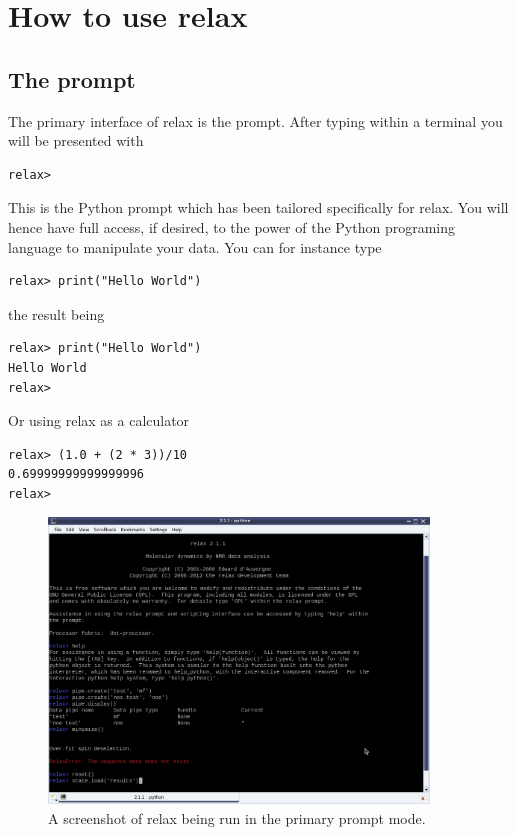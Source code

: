 
\section{How to use relax}



\subsection{The prompt}

The primary interface of relax is the prompt.  After typing  within a terminal you will be presented with

\begin{lstlisting}[numbers=none]
relax>
\end{lstlisting}

This is the Python prompt which has been tailored specifically for relax.  You will hence have full access, if desired, to the power of the Python programing language to manipulate your data.  You can for instance type

\begin{lstlisting}[numbers=none]
relax> print("Hello World")
\end{lstlisting}

the result being

\begin{lstlisting}[numbers=none]
relax> print("Hello World")
Hello World
relax>
\end{lstlisting}

Or using relax as a calculator

\begin{lstlisting}[numbers=none]
relax> (1.0 + (2 * 3))/10
0.69999999999999996
relax>
\end{lstlisting}

\begin{figure}
\centerline{\includegraphics[width=0.9\textwidth, bb=14 14 1088 821]{graphics/screenshots/relax_prompt_mode}}
\caption[Prompt screenshot]{A screenshot of relax being run in the primary prompt mode.}\label{fig: relax prompt}
\end{figure}



